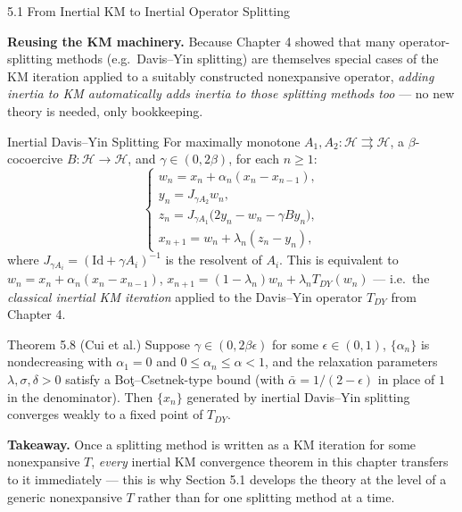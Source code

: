 \documentclass[aspectratio=169,10pt]{beamer}
\newcommand{\mHH}{\mathcal H}
\newcommand{\Id}{\mathrm{Id}}
\begin{document}
\begin{frame}[allowframebreaks]{5.1 From Inertial KM to Inertial Operator Splitting}

  \textbf{Reusing the KM machinery.}  Because Chapter 4 showed that
  many operator-splitting methods (e.g.\ Davis--Yin splitting) are
  themselves special cases of the KM iteration applied to a
  suitably constructed nonexpansive operator, \emph{adding inertia
  to KM automatically adds inertia to those splitting methods too}
  --- no new theory is needed, only bookkeeping.

  \begin{block}{Inertial Davis--Yin Splitting}
    For maximally monotone $A_1,A_2:\mHH\rightrightarrows\mHH$, a
    $\beta$-cocoercive $B:\mHH\to\mHH$, and $\gamma\in(0,2\beta)$,
    for each $n\ge1$:
    \[
      \begin{cases}
        w_n = x_n+\alpha_n(x_n-x_{n-1}), \\
        y_n = J_{\gamma A_2}w_n, \\
        z_n = J_{\gamma A_1}\bigl(2y_n-w_n-\gamma B y_n\bigr), \\
        x_{n+1} = w_n+\lambda_n(z_n-y_n),
      \end{cases}
    \]
    where $J_{\gamma A_i}=(\Id+\gamma A_i)^{-1}$ is the resolvent
    of $A_i$.  This is equivalent to
    $w_n=x_n+\alpha_n(x_n-x_{n-1})$,
    $x_{n+1}=(1-\lambda_n)w_n+\lambda_n T_{DY}(w_n)$ --- i.e.\ the
    \emph{classical inertial KM iteration} applied to the
    Davis--Yin operator $T_{DY}$ from Chapter 4.
  \end{block}

  \framebreak

  \begin{alertblock}{Theorem 5.8 (Cui et al.)}
    Suppose $\gamma\in(0,2\beta\epsilon)$ for some $\epsilon\in(0,1)$,
    $\{\alpha_n\}$ is nondecreasing with $\alpha_1=0$ and
    $0\le\alpha_n\le\alpha<1$, and the relaxation parameters
    $\lambda,\sigma,\delta>0$ satisfy a Bo\c{t}--Csetnek-type bound
    (with $\bar\alpha=1/(2-\epsilon)$ in place of $1$ in the
    denominator).  Then $\{x_n\}$ generated by inertial
    Davis--Yin splitting converges weakly to a fixed point of
    $T_{DY}$.
  \end{alertblock}

  \textbf{Takeaway.}  Once a splitting method is written as a KM
  iteration for some nonexpansive $T$, \emph{every} inertial KM
  convergence theorem in this chapter transfers to it immediately
  --- this is why Section 5.1 develops the theory at the level of
  a generic nonexpansive $T$ rather than for one splitting method
  at a time.

\end{frame}
\end{document}

